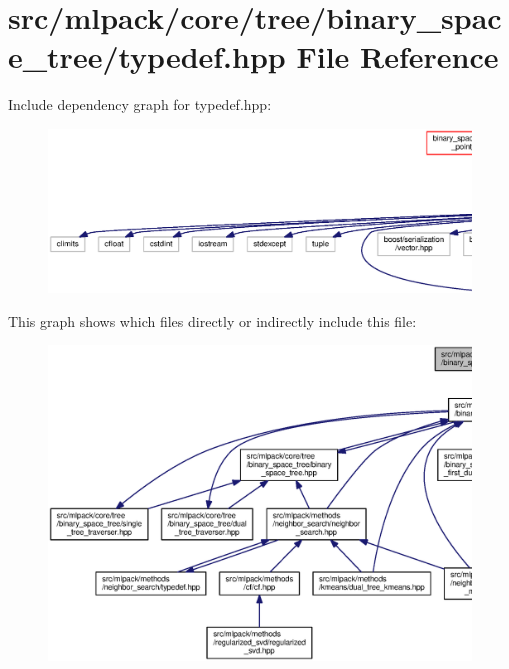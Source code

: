 \section{src/mlpack/core/tree/binary\+\_\+space\+\_\+tree/typedef.hpp File Reference}
\label{core_2tree_2binary__space__tree_2typedef_8hpp}
Include dependency graph for typedef.\+hpp\+:
\nopagebreak
\begin{figure}[H]
\begin{center}
\leavevmode
\includegraphics[width=350pt]{core_2tree_2binary__space__tree_2typedef_8hpp__incl}
\end{center}
\end{figure}
This graph shows which files directly or indirectly include this file\+:
\nopagebreak
\begin{figure}[H]
\begin{center}
\leavevmode
\includegraphics[width=350pt]{core_2tree_2binary__space__tree_2typedef_8hpp__dep__incl}
\end{center}
\end{figure}
